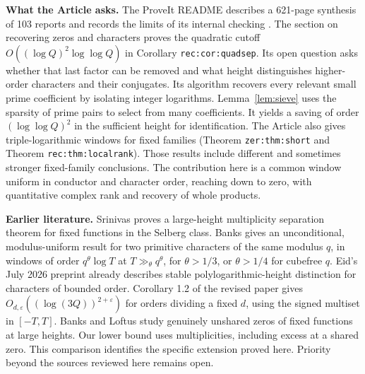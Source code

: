 \documentclass[11pt]{article}
\begin{document}
\textbf{What the Article asks.} The ProveIt README describes a 621-page synthesis of 103 reports and records the limits of its internal checking \cite{article}. The section on recovering zeros and characters proves the quadratic cutoff \(O((\log Q)^2\log\log Q)\) in Corollary \texttt{rec:cor:quadsep}. Its open question asks whether that last factor can be removed and what height distinguishes higher-order characters and their conjugates. Its algorithm recovers every relevant small prime coefficient by isolating integer logarithms. Lemma~\ref{lem:sieve} uses the sparsity of prime pairs to select from many coefficients. It yields a saving of order \((\log\log Q)^2\) in the sufficient height for identification. The Article also gives triple-logarithmic windows for fixed families (Theorem \texttt{zer:thm:short} and Theorem \texttt{rec:thm:localrank}). Those results include different and sometimes stronger fixed-family conclusions. The contribution here is a common window uniform in conductor and character order, reaching down to zero, with quantitative complex rank and recovery of whole products.

\textbf{Earlier literature.} Srinivas \cite{srinivas} proves a large-height multiplicity separation theorem for fixed functions in the Selberg class. Banks \cite{banks} gives an unconditional, modulus-uniform result for two primitive characters of the same modulus \(q\), in windows of order \(q^\theta\log T\) at \(T\gg_\theta q^\theta\), for \(\theta>1/3\), or \(\theta>1/4\) for cubefree \(q\). Eid's July 2026 preprint \cite{eid} already describes stable polylogarithmic-height distinction for characters of bounded order. Corollary 1.2 of the revised paper gives \(O_{d,\varepsilon}((\log(3Q))^{2+\varepsilon})\) for orders dividing a fixed \(d\), using the signed multiset in \([-T,T]\). Banks and Loftus \cite{loftus} study genuinely unshared zeros of fixed functions at large heights. Our lower bound uses multiplicities, including excess at a shared zero. This comparison identifies the specific extension proved here. Priority beyond the sources reviewed here remains open.
\end{document}
